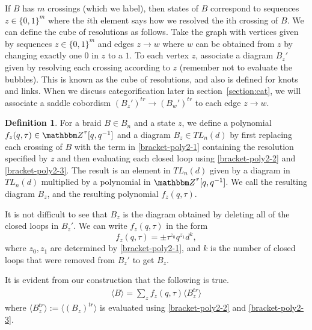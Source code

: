 \documentclass{amsart}
\theoremstyle{plain}
\theoremstyle{definition}
\newtheorem{definition}[theorem]{Definition}
\theoremstyle{definition}
\numberwithin{equation}{section}
\numberwithin{theorem}{section}
\renewcommand{\to}{\rightarrow}
\numberwithin{equation}{section}
\def\Z{{\mathbbm Z}}
\begin{document}
If $B$ has $m$ crossings (which we label), then states of $B$ correspond to sequences $z\in \{0,1\}^m$ where the $i$th element says how we resolved the ith crossing of $B$. We can define the cube of resolutions as follows.
Take the graph with vertices given by sequences $z\in \{0,1\}^m$ and edges $z\to w$ where $w$ can be obtained from $z$ by changing exactly one $0$ in $z$ to a $1$.
To each vertex $z$, associate a diagram $B_z'$ given by resolving each crossing according to $z$ (remember not to evaluate the bubbles).
This is known as the cube of resolutions, and also is defined for knots and links.
When we discuss categorification later in section~\ref{section:cat}, we will associate a saddle cobordism $(B_{z}')^{tr}\to (B_{w}')^{tr}$ to each edge $z\to w$.

\begin{definition}
  For a braid $B\in B_n$ and a state $z$, we define a polynomial $f_z(q,\tau)\in \Z^\tau[q,q^{-1}]$ and a diagram $B_z\in TL_n(d)$ by first replacing each crossing of $B$ with the term in \eqref{bracket-poly2-1} containing the resolution specified by $z$ and then evaluating each closed loop using \eqref{bracket-poly2-2} and \eqref{bracket-poly2-3}.
  The result is an element in $TL_n(d)$ given by a diagram in $TL_n(d)$ multiplied by a polynomial in $\Z^\tau[q, q^{-1}]$.
  We call the resulting diagram $B_z$, and the resulting polynomial $f_{z}(q,\tau)$.
\end{definition}

It is not difficult to see that $B_z$ is the diagram obtained by deleting all of the closed loops in $B_z'$.
We can write $f_z(q,\tau)$ in the form
\[f_z(q,\tau)=\pm \tau^{z_0}q^{z_1} d^k,\]
where $z_0,z_1$ are determined by \eqref{bracket-poly2-1}, and $k$ is the number of closed loops that were removed from $B_z'$ to get $B_z$.

It is evident from our construction that the following is true.
\begin{align}\label{state-sum}
  \langle B \rangle=\sum_z f_z(q,\tau) \langle B_z^{tr}\rangle
\end{align}
where $\langle B_z^{tr} \rangle:=\langle (B_z)^{tr} \rangle$ is evaluated using \eqref{bracket-poly2-2} and \eqref{bracket-poly2-3}.
\end{document}
